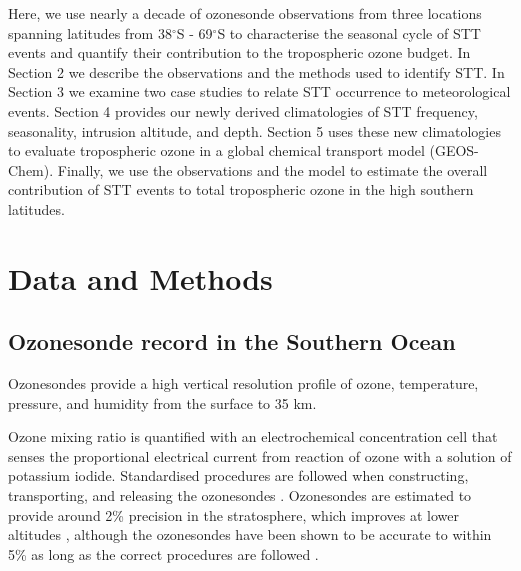 \documentclass{article}
\begin{document}


    Here, we use nearly a decade of ozonesonde observations from three locations spanning latitudes from 38$^{\circ}$S - 69$^{\circ}$S to characterise the seasonal cycle of STT events and quantify their contribution to the tropospheric ozone budget. 
    In Section 2 we describe the observations and the methods used to identify STT. 
    In Section 3 we examine two case studies to relate STT occurrence to meteorological events.
    Section 4 provides our newly derived climatologies of STT frequency, seasonality, intrusion altitude, and depth. 
    Section 5 uses these new climatologies to evaluate tropospheric ozone in a global chemical transport model (GEOS-Chem). 
    Finally, we use the observations and the model to estimate the overall contribution of STT events to total tropospheric ozone in the high southern latitudes.

\section{Data and Methods}

  \subsection{Ozonesonde record in the Southern Ocean}
  \label{Section:ozonesondes}
    Ozonesondes provide a high vertical resolution profile of ozone, temperature, pressure, and humidity from the surface to 35 km.
    
    Ozone mixing ratio is quantified with an electrochemical concentration cell that senses the proportional electrical current from reaction of ozone with a solution of potassium iodide.
    Standardised procedures are followed when constructing, transporting, and releasing the ozonesondes \citep{noaasondes}.
    Ozonesondes are estimated to provide around 2\% precision in the stratosphere, which improves at lower altitudes \citep{noaasondes}, although the ozonesondes have been shown to be accurate to within 5\% as long as the correct procedures are followed \citep{Smit2007}.
    
\end{document}
